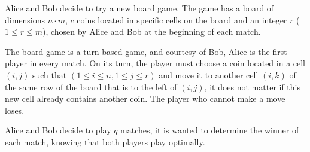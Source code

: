 %

Alice and Bob decide to try a new board game. The game has a board of dimensions $n \cdot m$, $c$ coins located in specific cells on the board and an integer $r$ ($1 \le r \le m$), chosen by Alice and Bob at the beginning of each match.

The board game is a turn-based game, and courtesy of Bob, Alice is the first player in every match. On its turn, the player must choose a coin located in a cell $(i, j)$ such that $(1 \le i \le n, 1 \le j \le r)$ and move it to another cell $(i, k)$ of the same row of the board that is to the left of $(i, j)$, it does not matter if this new cell already contains another coin. The player who cannot make a move loses.

Alice and Bob decide to play $q$ matches, it is wanted to determine the winner of each match, knowing that both players play optimally.




\sampleio
